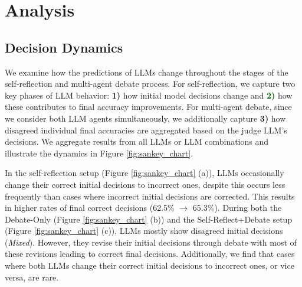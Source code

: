 \section{Analysis}
\label{sec:analysis}



\subsection{Decision Dynamics}
\label{sec:decision_dynamics}


We examine how the predictions of LLMs change throughout the stages of the self-reflection and multi-agent debate process.  For self-reflection, we capture two key phases of LLM behavior: \textcolor{darkpurple}{\textbf{1)}} how initial model decisions change and \textcolor{darkgreen}{\textbf{2)}} how these contributes to final accuracy improvements. For multi-agent debate, since we consider both LLM agents simultaneously, we additionally capture \textcolor{bblue}{\textbf{3)}} how disagreed individual final accuracies are aggregated based on the judge LLM's decisions. We aggregate results from all LLMs or LLM combinations and illustrate the dynamics in Figure \ref{fig:sankey_chart}. 


In the self-reflection setup (Figure \ref{fig:sankey_chart} (a)), LLMs occasionally change their correct initial decisions to incorrect ones, despite this occurs less frequently than cases where incorrect initial decisions are corrected. This results in higher rates of final correct decisions (62.5\% $\rightarrow$ 65.3\%). During both the Debate-Only (Figure \ref{fig:sankey_chart} (b)) and the Self-Reflect+Debate setup (Figure \ref{fig:sankey_chart} (c)), LLMs mostly show disagreed initial decisions (\textit{Mixed}). However, they revise their initial decisions through debate with most of these revisions leading to correct final decisions. Additionally, we find that cases where both LLMs change their correct initial decisions to incorrect ones, or vice versa, are rare. 

